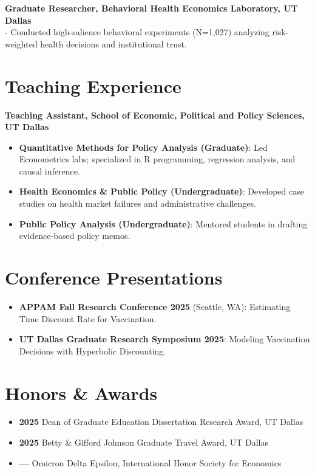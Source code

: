 \documentclass[11pt]{article}
\begin{document}
\vspace{0.5em}
\noindent \textbf{Graduate Researcher, Behavioral Health Economics Laboratory, UT Dallas} \\
- Conducted high-salience behavioral experiments (N=1,027) analyzing risk-weighted health decisions and institutional trust.

\section*{Teaching Experience}
\textbf{Teaching Assistant, School of Economic, Political and Policy Sciences, UT Dallas}
\begin{itemize}[noitemsep, topsep=0pt]
    \item \textbf{Quantitative Methods for Policy Analysis (Graduate)}: Led Econometrics labs; specialized in R programming, regression analysis, and causal inference.
    \item \textbf{Health Economics \& Public Policy (Undergraduate)}: Developed case studies on health market failures and administrative challenges.
    \item \textbf{Public Policy Analysis (Undergraduate)}: Mentored students in drafting evidence-based policy memos.
\end{itemize}

\section*{Conference Presentations}
\begin{itemize}[noitemsep, topsep=0pt]
    \item \textbf{APPAM Fall Research Conference 2025} (Seattle, WA): Estimating Time Discount Rate for Vaccination.
    \item \textbf{UT Dallas Graduate Research Symposium 2025}: Modeling Vaccination Decisions with Hyperbolic Discounting.
\end{itemize}

\section*{Honors \& Awards}
\begin{itemize}[noitemsep, topsep=0pt]
    \item \textbf{2025} Dean of Graduate Education Dissertation Research Award, UT Dallas
    \item \textbf{2025} Betty \& Gifford Johnson Graduate Travel Award, UT Dallas
    \item \textbf{---} Omicron Delta Epsilon, International Honor Society for Economics
\end{itemize}
\end{document}

